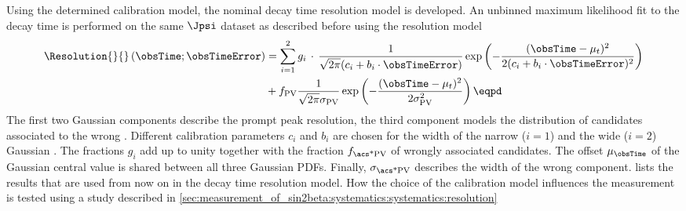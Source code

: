 Using the determined calibration model, the nominal decay time resolution model
is developed. An unbinned maximum likelihood fit to the \Bd decay time is
performed on the same $\Jpsi$ \sweighted dataset as described before using the
resolution model
%
\begin{equation}\label{eq:measurement_of_sin2beta:resolution_and_acceptance:resolution}
\begin{split}
  \Resolution{}{}\left(\obsTime;\obsTimeError\right)
  &= \sum_{i=1}^{2}{g_i\,\cdot\,\frac{1}{\sqrt{2\pi}(c_i + b_i \cdot \obsTimeError)}\exp\left(-\frac{(\obsTime - \mu_t)^2}{2(c_i + b_i \cdot \obsTimeError)^2}\right)}\\
  &+ f_{\text{PV}} \frac{1}{\sqrt{2\pi} \sigma_{\text{PV}}} \exp\left(-\frac{(\obsTime - \mu_t)^2}{2 \sigma_{\text{PV}}^2}\right) \eqpd
\end{split}
\end{equation}
%
The first two Gaussian components describe the prompt peak resolution, the third
component models the distribution of candidates associated to the wrong \PV.
Different calibration parameters $c_i$ and $b_i$ are chosen for the width of the
narrow ($i=1$) and the wide ($i=2$) Gaussian \PDF. The fractions $g_i$ add up to
unity together with the fraction $f_\text{\acs*{PV}}$ of wrongly associated
candidates. The offset $\mu_{\obsTime}$ of the Gaussian central value is shared
between all three Gaussian \acp{PDF}. Finally, $\sigma_{\text{\acs*{PV}}}$
describes the width of the wrong \PV component.
lists the results that are used from now on in the decay time resolution model.
How the choice of the calibration model influences the measurement is tested
using a \ToyMC study described in
\cref{sec:measurement_of_sin2beta:systematics:systematics:resolution}
%
